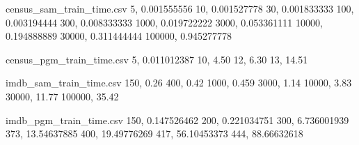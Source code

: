 \usepackage{tikz}
\begin{filecontents*}{census_sam_train_time.csv}
    5, 0.001555556
    10, 0.001527778
    30, 0.001833333
    100, 0.003194444
    300, 0.008333333
    1000, 0.019722222
    3000, 0.053361111
    10000, 0.194888889
    30000, 0.311444444
    100000, 0.945277778
\end{filecontents*}
\begin{filecontents*}{census_pgm_train_time.csv}
    5, 0.011012387
    10, 4.50
    12, 6.30
    13, 14.51
\end{filecontents*}
\begin{filecontents*}{imdb_sam_train_time.csv}
    150, 0.26
    400, 0.42
    1000, 0.459
    3000, 1.14
    10000, 3.83
    30000, 11.77
    100000, 35.42
\end{filecontents*}
\begin{filecontents*}{imdb_pgm_train_time.csv}
    150, 0.147526462
    200, 0.221034751
    300, 6.736001939
    373, 13.54637885
    400, 19.49776269
    417, 56.10453373
    444, 88.66632618
\end{filecontents*}
